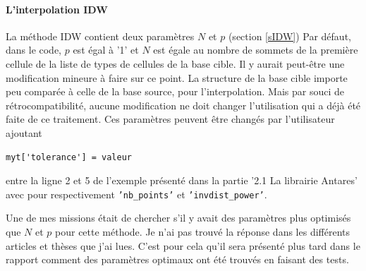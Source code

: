 \label{implementation_IDW}\paragraph{L'interpolation IDW}

La méthode IDW contient deux paramètres \(N\) et \(p\) (section \ref{sIDW})
Par défaut, dans le code, \(p\) est égal à '1' et \(N\) est égale au nombre de sommets de la première cellule de la liste de types de cellules de la base cible. Il y aurait peut-être une modification mineure à faire sur ce point. La structure de la base cible importe peu comparée à celle de la base source, pour l'interpolation. Mais par souci de rétrocompatibilité, aucune modification ne doit changer l'utilisation qui a déjà été faite de ce traitement. %
Ces paramètres peuvent être changés par l'utilisateur ajoutant
\begin{lstlisting}[]
    myt['tolerance'] = valeur
\end{lstlisting}
entre la ligne 2 et 5 de l'exemple présenté dans la partie '2.1 La librairie Antares' avec pour respectivement \texttt{'nb\_points'} et \texttt{'invdist\_power'}.\label{parametres}

Une de mes missions était de chercher s'il y avait des paramètres plus optimisés que \(N\) et \(p\) pour cette méthode. Je n'ai pas trouvé la réponse dans les différents articles \cite{idw-arcgis} et thèses que j'ai lues. C'est pour cela qu'il sera présenté plus tard dans le rapport comment des paramètres optimaux ont été trouvés en faisant des tests.

